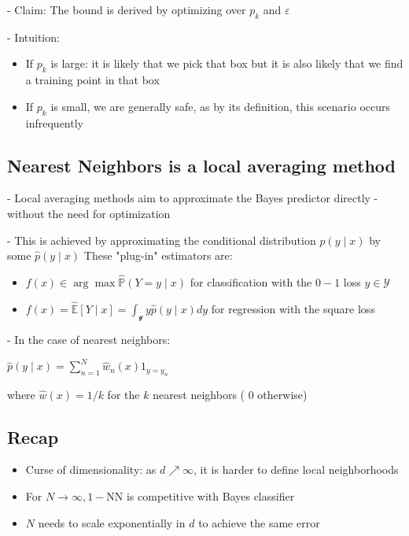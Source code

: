 - Claim: The bound is derived by optimizing over $p_{k}$ and $\varepsilon$

- Intuition:

\begin{itemize}
  \item If $p_{k}$ is large: it is likely that we pick that box but it is also likely that we find a training point in that box
  \item If $p_{k}$ is small, we are generally safe, as by its definition, this scenario occurs infrequently
\end{itemize}


\subsection*{Nearest Neighbors is a local averaging method}
- Local averaging methods aim to approximate the Bayes predictor directly - without the need for optimization

- This is achieved by approximating the conditional distribution $p(y \mid x)$ by some $\hat{p}(y \mid x)$ These "plug-in" estimators are:

\begin{itemize}
    \item $f(x) \in \arg \max \hat{\mathbb{P}}(Y=y \mid x)$ for classification with the $0-1$ loss $y \in \mathcal{Y}$
  \item $f(x)=\hat{\mathbb{E}}[Y \mid x]=\int_{\mathscr{y}} y \hat{p}(y \mid x) d y$ for regression with the square loss
  
\end{itemize}

- In the case of nearest neighbors:

$
\hat{p}(y \mid x)=\sum_{n=1}^{N} \hat{w}_{n}(x) 1_{y=y_{n}}
$

where $\hat{w}(x)=1 / k$ for the $k$ nearest neighbors ( 0 otherwise)

\subsection*{Recap}
\begin{itemize}
  \item Curse of dimensionality: as $d \nearrow \infty$, it is harder to define local neighborhoods

  \item For $N \rightarrow \infty, 1-\mathrm{NN}$ is competitive with Bayes classifier

  \item $N$ needs to scale exponentially in $d$ to achieve the same error

\end{itemize}